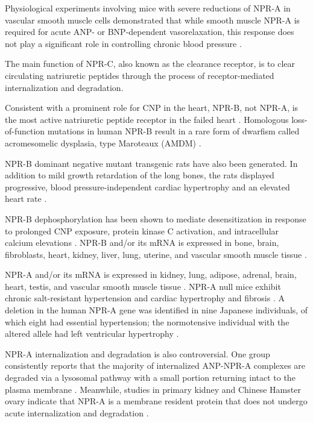 \documentclass[14pt,a4paper,onecolumn]{extarticle}
\begin{document}
Physiological experiments involving mice with severe reductions of NPR-A in vascular smooth muscle cells demonstrated that while smooth muscle NPR-A is required for acute ANP- or BNP-dependent vasorelaxation, this response does not play a significant role in controlling chronic blood pressure \citep{Holtwick2002}. %

The main function of NPR-C, also known as the clearance receptor, is to clear circulating natriuretic peptides through the process of receptor-mediated internalization and degradation. %

Consistent with a prominent role for CNP in the heart, NPR-B, not NPR-A, is the most active natriuretic peptide receptor in the failed heart \citep{Dickey2007}. Homologous loss-of-function mutations in human NPR-B result in a rare form of dwarfism called acromesomelic dysplasia, type Maroteaux (AMDM) \citep{Bartels2004}. %

NPR-B dominant negative mutant transgenic rats have also been generated. In addition to mild growth retardation of the long bones, the rats displayed progressive, blood pressure-independent cardiac hypertrophy and an elevated heart rate \citep{Langenickel2006}. %

NPR-B dephosphorylation has been shown to mediate desensitization in response to prolonged CNP exposure, protein kinase C activation, and intracellular calcium elevations \citep{Potter2000} \citep{Potthast2004}. NPR-B and/or its mRNA is expressed in bone, brain, fibroblasts, heart, kidney, liver, lung, uterine, and vascular smooth muscle tissue \citep{Bryan2006} \citep{Dickey2007}. %

NPR-A and/or its mRNA is expressed in kidney, lung, adipose, adrenal, brain, heart, testis, and vascular smooth muscle tissue \citep{Goy2001}. NPR-A null mice exhibit chronic salt-resistant hypertension and cardiac hypertrophy and fibrosis \citep{Kuhn2002}.  A deletion in the human NPR-A gene was identified in nine Japanese individuals, of which eight had essential hypertension; the normotensive individual with the altered allele had left ventricular hypertrophy \citep{Nakayama2000}. %

NPR-A internalization and degradation is also controversial. One group consistently reports that the majority of internalized ANP-NPR-A complexes are degraded via a lysosomal pathway with a small portion returning intact to the plasma membrane \citep{Pandey2002}. Meanwhile, studies in primary kidney and Chinese Hamster ovary indicate that NPR-A is a membrane resident protein that does not undergo acute internalization and degradation \citep{Fan2005} \citep{Vieira2001}. %
\end{document}

